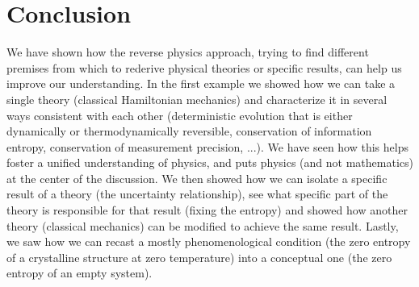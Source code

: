 \documentclass[10pt,twocolumn, nofootinbib]{revtex4-2}
\begin{document}
%

\section{Conclusion}

We have shown how the reverse physics approach, trying to find different premises from which to rederive physical theories or specific results, can help us improve our understanding. In the first example we showed how we can take a single theory (classical Hamiltonian mechanics) and characterize it in several ways consistent with each other (deterministic evolution that is either dynamically or thermodynamically reversible, conservation of information entropy, conservation of measurement precision, ...). We have seen how this helps foster a unified understanding of physics, and puts physics (and not mathematics) at the center of the discussion. We then showed how we can isolate a specific result of a theory (the uncertainty relationship), see what specific part of the theory is responsible for that result (fixing the entropy) and showed how another theory (classical mechanics) can be modified to achieve the same result. Lastly, we saw how we can recast a mostly phenomenological condition (the zero entropy of a crystalline structure at zero temperature) into a conceptual one (the zero entropy of an empty system).
\end{document}
